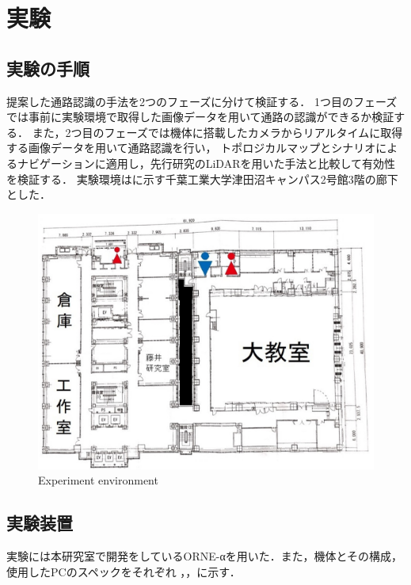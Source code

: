 \documentclass[../main]{subfiles}
\begin{document}
\setcounter{secnumdepth}{3}
    \chapter{実験}
    \section{実験の手順}
        提案した通路認識の手法を2つのフェーズに分けて検証する．
        1つ目のフェーズでは事前に実験環境で取得した画像データを用いて通路の認識ができるか検証する．
        また，2つ目のフェーズでは機体に搭載したカメラからリアルタイムに取得する画像データを用いて通路認識を行い，
        トポロジカルマップとシナリオによるナビゲーションに適用し，先行研究のLiDARを用いた手法と比較して有効性を検証する．
        実験環境はに示す千葉工業大学津田沼キャンパス2号館3階の廊下とした．
        \begin{figure}[H]
         \centering
         \includegraphics[width=15cm]{../images/MAP_Tsudanuma2-3.png}
         \caption{Experiment environment}
         \label{figure::3floor_map}
        \end{figure}

    \section{実験装置}
        実験には本研究室で開発をしているORNE-αを用いた．また，機体とその構成，使用したPCのスペックをそれぞれ
        ，，に示す．
        
\end{document}
